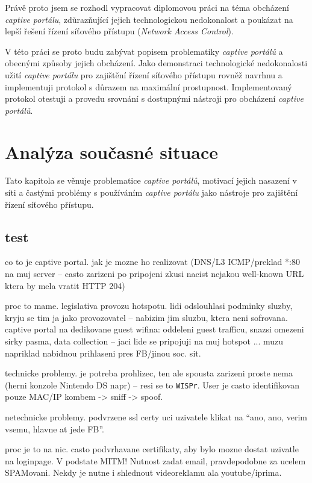 \documentclass[thesis=M,czech]{FITthesis}[2012/10/20]
\begin{document}
\begin{introduction}
Právě proto jsem se rozhodl vypracovat diplomovou práci na téma obcházení \textit{captive portálu}, zdůrazňující jejich technologickou nedokonalost a poukázat na lepší řešení řízení síťového přístupu (\textit{Network Access Control}).

V této práci se proto budu zabývat popisem problematiky \textit{captive portálů} a obecnými způsoby jejich obcházení. Jako demonstraci technologické nedokonalosti užití \textit{captive portálu} pro zajištění řízení síťového přístupu rovněž navrhnu a implementuji protokol s důrazem na maximální prostupnost. Implementovaný protokol otestuji a provedu srovnání s dostupnými nástroji pro obcházení \textit{captive portálů}.
\end{introduction}

\chapter{Analýza současné situace}

Tato kapitola se věnuje problematice \textit{captive portálů}, motivací jejich nasazení v síti a častými problémy s používáním \textit{captive portálu} jako nástroje pro zajištění řízení síťového přístupu.


\section{test}

co to je captive portal. jak je mozne ho realizovat (DNS/L3 ICMP/preklad *:80 na muj server -- casto zarizeni po pripojeni zkusi nacist nejakou well-known URL ktera by mela vratit HTTP 204)

proc to mame. legislativa provozu hotspotu. lidi odslouhlasi podminky sluzby, kryju se tim ja jako provozovatel -- nabizim jim sluzbu, ktera neni sofrovana.
captive portal na dedikovane guest wifina: oddeleni guest trafficu, snazsi omezeni sirky pasma, data collection -- jaci lide se pripojuji na muj hotspot ... muzu napriklad nabidnou prihlaseni pres FB/jinou soc. sit.

technicke problemy. je potreba prohlizec, ten ale spousta zarizeni proste nema (herni konzole Nintendo DS napr) -- resi se to \texttt{WISPr}. User je casto identifikovan pouze MAC/IP kombem -> sniff -> spoof.

netechnicke problemy. podvrzene ssl certy uci uzivatele klikat na ``ano, ano, verim vsemu, hlavne at jede FB''.

proc je to na nic. casto podvrhavane certifikaty, aby bylo mozne dostat uzivatle na loginpage. V podstate MITM! Nutnost zadat email, pravdepodobne za ucelem SPAMovani. Nekdy je nutne i shlednout videoreklamu ala youtube/iprima.
\end{document}
